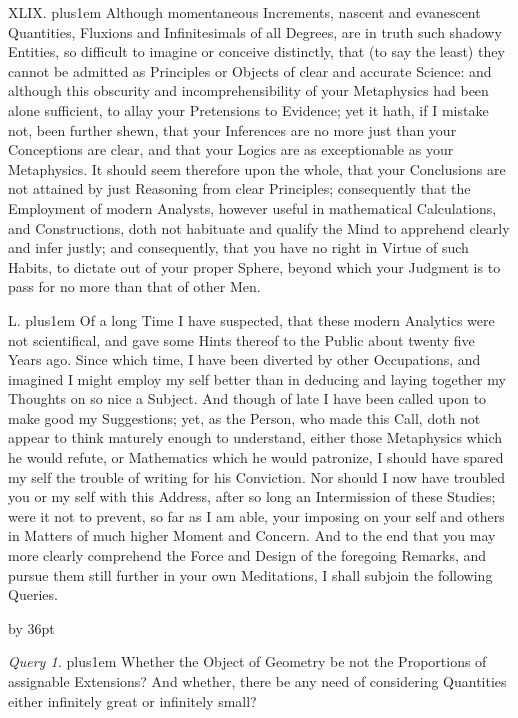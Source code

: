 \medbreak

XLIX. \hskip 0pt plus1em
Although momentaneous Increments, nascent and evanescent
Quantities, Fluxions and Infinitesimals of all Degrees, are in
truth such shadowy Entities, so difficult to imagine or conceive
distinctly, that (to say the least) they cannot be admitted as
Principles or Objects of clear and accurate Science: and although
this obscurity and incomprehensibility of your Metaphysics had
been alone sufficient, to allay your Pretensions to Evidence; yet
it hath, if I mistake not, been further shewn, that your
Inferences are no more just than your Conceptions are clear, and
that your Logics are as exceptionable as your Metaphysics.  It
should seem therefore upon the whole, that your Conclusions are
not attained by just Reasoning from clear Principles;
consequently that the Employment of modern Analysts, however
useful in mathematical Calculations, and Constructions, doth not
habituate and qualify the Mind to apprehend clearly and infer
justly; and consequently, that you have no right in Virtue of
such Habits, to dictate out of your proper Sphere, beyond which
your Judgment is to pass for no more than that of other Men.

\medbreak

L. \hskip 0pt plus1em
Of a long Time I have suspected, that these modern Analytics were
not scientifical, and gave some Hints thereof to the Public about
twenty five Years ago.  Since which time, I have been diverted by
other Occupations, and imagined I might employ my self better
than in deducing and laying together my Thoughts on so nice a
Subject.  And though of late I have been called upon to make good
my Suggestions; yet, as the Person, who made this Call, doth not
appear to think maturely enough to understand, either those
Metaphysics which he would refute, or Mathematics which he would
patronize, I should have spared my self the trouble of writing
for his Conviction.  Nor should I now have troubled you or my
self with this Address, after so long an Intermission of these
Studies; were it not to prevent, so far as I am able, your
imposing on your self and others in Matters of much higher Moment
and Concern.  And to the end that you may more clearly comprehend
the Force and Design of the foregoing Remarks, and pursue them
still further in your own Meditations, I shall subjoin the
following Queries.

\bigbreak

\begingroup\advance\leftskip by 36pt

\item{\it Query 1.} \hskip 0pt plus1em
Whether the Object of Geometry be not the Proportions of
assignable Extensions?  And whether, there be any need of
considering Quantities either infinitely great or infinitely
small?

